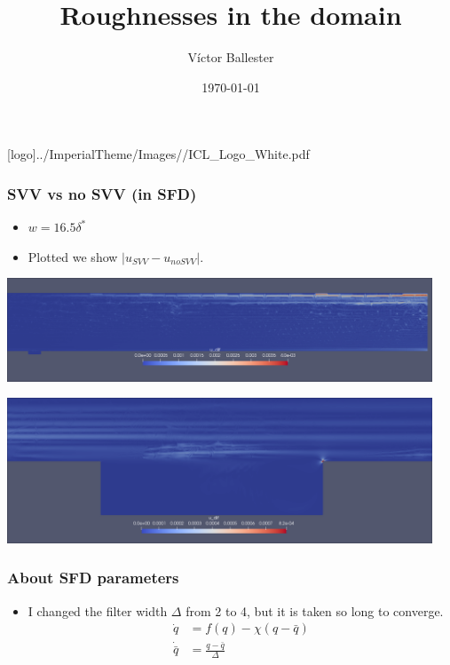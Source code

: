 \documentclass[
  aspectratio=169, %
  t, %
  onlytextwidth, %
  10pt, %
]{beamer}
\title{Roughnesses in the domain} %
\subtitle{} %
\author{Víctor Ballester} %
\date{\today} %
\def\imagefolder{../ImperialTheme/Images/}
\begin{document}
\begingroup
{} %
[logo]{\imagefolder/ICL_Logo_White.pdf} %
\frame[plain, s]{\titlepage} %
\endgroup

\begin{frame}
  \frametitle{SVV vs no SVV (in SFD)}
  \begin{itemize}
    \item $w = 16.5\delta^*$  
    \item Plotted we show $|u_{SVV} - u_{no SVV}|$.
  \end{itemize}
  {
    \centering
    \includegraphics[width=0.95\textwidth]{Images/svv_full.png}
  }
\end{frame}
\begin{frame}
  {
    \centering
    \includegraphics[width=0.95\textwidth]{Images/svv_gap.png}
  }
\end{frame}
\begin{frame}
  \frametitle{About SFD parameters}
  \begin{itemize}
  	\item I changed the filter width $\Delta$ from 2 to 4, but it is taken so long to converge. 
	  \begin{align*}
	    \dot{q} &= f(q) -\chi (q-\bar{q})\\
	    \dot{\bar{q}} &= \frac{q-\bar{q}}{\Delta}
	  \end{align*}
  \end{itemize}
\end{frame}
\end{document}
